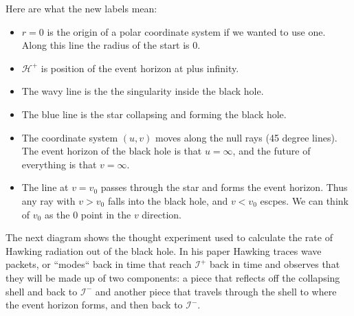 \documentclass[12pt,border=3pt,tikz]{article}
\def\scri{\mathscr I}
\begin{document}
Here are what the new labels mean:

\begin{itemize}
\item $r=0$ is the origin of a polar coordinate system if we wanted to use one. Along this line the
radius of the start is $0$.
\item ${\mathcal H}^+$ is position of the event horizon at plus infinity.
\item The wavy line is the the singularity inside the black hole.
\item The blue line is the star collapsing and forming the black hole.
\item The coordinate system $(u,v)$ moves along the null rays (45 degree lines). The event
horizon of the black hole is that $u=\infty$, and the future of everything is that $v=\infty$.
\item The line at $v=v_0$  passes through the star and forms the
event horizon. Thus any ray with $v > v_0$ falls into the black hole, and $v < v_0$ escpes. 
We can think of $v_0$ as the $0$ point in the $v$ direction.
\end{itemize}
\newpage
\noindent
The next diagram shows the thought experiment used to calculate the rate of Hawking radiation
out of the black hole. In his paper Hawking traces wave packets, or ``modes`` back in time
that reach $\scri^+$ back in time and observes that they will be made up of two components: a
piece that reflects off the collapsing shell and back to $\scri^-$ and another piece that travels
through the shell to where the event horizon forms, and then back to $\scri^-$.
\end{document}
